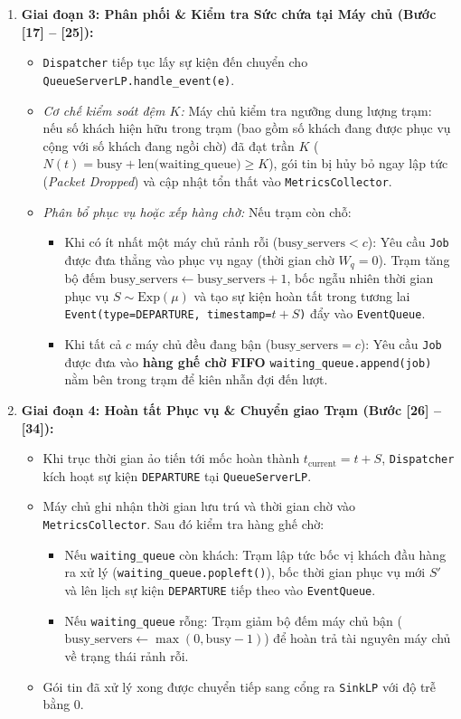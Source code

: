 \begin{enumerate}[leftmargin=2em, itemsep=6pt]
\item \textbf{Giai đoạn 3: Phân phối \& Kiểm tra Sức chứa tại Máy chủ (Bước [17] -- [25]):}
\begin{itemize}[leftmargin=1.5em, itemsep=2pt]
\item \texttt{Dispatcher} tiếp tục lấy sự kiện đến chuyển cho \texttt{QueueServerLP.handle\_event(e)}.
\item \textit{Cơ chế kiểm soát đệm $K$:} Máy chủ kiểm tra ngưỡng dung lượng trạm: nếu số khách hiện hữu trong trạm (bao gồm số khách đang được phục vụ cộng với số khách đang ngồi chờ) đã đạt trần $K$ ($N(t) = \text{busy} + \text{len(waiting\_queue)} \ge K$), gói tin bị hủy bỏ ngay lập tức (\textit{Packet Dropped}) và cập nhật tổn thất vào \texttt{MetricsCollector}.
\item \textit{Phân bổ phục vụ hoặc xếp hàng chờ:} Nếu trạm còn chỗ:
\begin{itemize}[leftmargin=1.2em, itemsep=1pt]
\item Khi có ít nhất một máy chủ rảnh rỗi ($\text{busy\_servers} < c$): Yêu cầu \texttt{Job} được đưa thẳng vào phục vụ ngay (thời gian chờ $W_q = 0$). Trạm tăng bộ đếm $\text{busy\_servers} \leftarrow \text{busy\_servers} + 1$, bốc ngẫu nhiên thời gian phục vụ $S \sim \text{Exp}(\mu)$ và tạo sự kiện hoàn tất trong tương lai \texttt{Event(type=DEPARTURE, timestamp=$t + S$)} đẩy vào \texttt{EventQueue}.
\item Khi tất cả $c$ máy chủ đều đang bận ($\text{busy\_servers} = c$): Yêu cầu \texttt{Job} được đưa vào \textbf{hàng ghế chờ FIFO} \texttt{waiting\_queue.append(job)} nằm bên trong trạm để kiên nhẫn đợi đến lượt.
\end{itemize}
\end{itemize}

\item \textbf{Giai đoạn 4: Hoàn tất Phục vụ \& Chuyển giao Trạm (Bước [26] -- [34]):}
\begin{itemize}[leftmargin=1.5em, itemsep=2pt]
\item Khi trục thời gian ảo tiến tới mốc hoàn thành $t_{\text{current}} = t + S$, \texttt{Dispatcher} kích hoạt sự kiện \texttt{DEPARTURE} tại \texttt{QueueServerLP}.
\item Máy chủ ghi nhận thời gian lưu trú và thời gian chờ vào \texttt{MetricsCollector}. Sau đó kiểm tra hàng ghế chờ:
\begin{itemize}[leftmargin=1.2em, itemsep=1pt]
\item Nếu \texttt{waiting\_queue} còn khách: Trạm lập tức bốc vị khách đầu hàng ra xử lý (\texttt{waiting\_queue.popleft()}), bốc thời gian phục vụ mới $S'$ và lên lịch sự kiện \texttt{DEPARTURE} tiếp theo vào \texttt{EventQueue}.
\item Nếu \texttt{waiting\_queue} rỗng: Trạm giảm bộ đếm máy chủ bận ($\text{busy\_servers} \leftarrow \max(0, \text{busy} - 1)$) để hoàn trả tài nguyên máy chủ về trạng thái rảnh rỗi.
\end{itemize}
\item Gói tin đã xử lý xong được chuyển tiếp sang cổng ra \texttt{SinkLP} với độ trễ bằng 0.
\end{itemize}


\end{enumerate}
